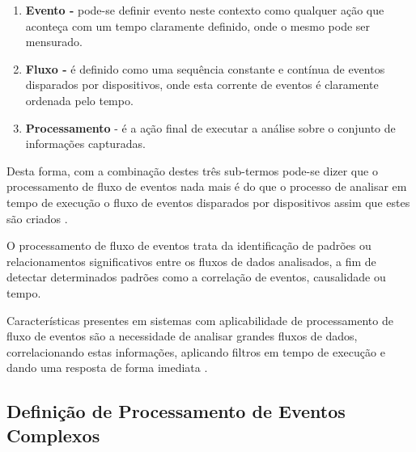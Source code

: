 \documentclass[ti,table]{texufpel} %
\begin{document}

\begin{enumerate} 

    \item  \textbf{Evento -} pode-se definir evento neste contexto como qualquer ação que aconteça com um tempo claramente definido, onde o mesmo pode ser mensurado.   

     

    \item  \textbf{Fluxo -} é definido como uma sequência constante e contínua de eventos disparados por dispositivos, onde esta corrente de eventos é claramente ordenada pelo tempo. 

     

    \item  \textbf{Processamento} - é a ação final de executar a análise sobre o conjunto de informações capturadas. 

\end{enumerate} 

Desta forma, com a combinação destes três sub-termos pode-se dizer que o processamento de fluxo de eventos nada mais é do que o processo de analisar em tempo de execução o fluxo de eventos disparados por dispositivos assim que estes são criados \cite{dayarathna2018recent}.  

  

O processamento de fluxo de eventos trata da identificação de padrões ou relacionamentos significativos entre os fluxos de dados analisados, a fim de detectar determinados padrões como a correlação de eventos, causalidade ou tempo. 

Características presentes em sistemas com aplicabilidade de processamento de fluxo de eventos são a necessidade de analisar grandes fluxos de dados, correlacionando estas informações, aplicando filtros em tempo de execução e dando uma resposta de forma imediata \cite{appel2013event}. 

  

  


  

\subsection{Definição de Processamento de Eventos Complexos} 
\end{document}
